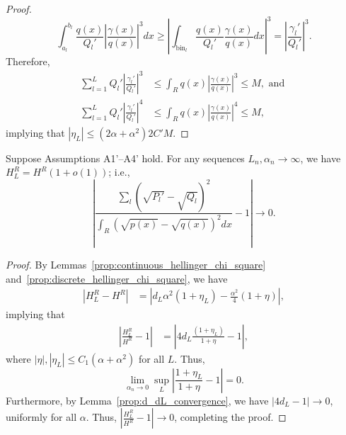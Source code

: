 \documentclass{article}
\newcommand{\bin}{\text{bin}}
\begin{document}
\begin{proof}
\[
\int_{a_l}^{b_l} \frac{q(x)}{Q_l'} \left| \frac{\gamma(x)}{q(x)} \right|^3 dx \geq
 \left| \int_{\bin_l} \frac{q(x)}{Q_l'} \frac{\gamma(x)}{q(x)} dx \right|^3 =
 \left| \frac{\gamma_l'}{Q_l'} \right|^3.
\]
Therefore,
\begin{align*}
\sum_{l=1}^L Q_l' \left| \frac{\gamma_l'}{Q_l'} \right|^3 &\leq \int_R q(x) \left| \frac{\gamma(x)}{q(x)} \right|^3 \leq M,  \text{ and }\\
\sum_{l=1}^L Q_l' \left| \frac{\gamma_l'}{Q_l'} \right|^4 &\leq \int_R q(x) \left| \frac{\gamma(x)}{q(x)} \right|^4 \leq M,
\end{align*}
implying that $|\eta_L| \leq (2 \alpha + \alpha^2) 2 C' M$.
\end{proof}






\begin{lemma}
\label{prop:H_HL_convergence_R}
Suppose Assumptions A1'--A4' hold. For any sequences $L_n, \alpha_n \rightarrow \infty$, we have $H^R_L = H^R(1+o(1))$; i.e.,
\[
\left| \frac{\sum_l (\sqrt{P_l'} - \sqrt{Q_l})^2}{\int_R (\sqrt{p(x)} - \sqrt{q(x)})^2 dx} 
        - 1 \right| \rightarrow 0.
\]

\end{lemma}

\begin{proof}
By Lemmas~\ref{prop:continuous_hellinger_chi_square} and~\ref{prop:discrete_hellinger_chi_square}, we have
\begin{align*}
| H^R_L - H^R | & = \left| d_L \alpha^2 ( 1 + \eta_L) -  \frac{\alpha^2}{4} ( 1 + \eta) \right|,
 \end{align*}
implying that
\begin{align*}
\left| \frac{H^R_L}{H^R} - 1 \right| &= \left |4d_L \frac{(1+\eta_L)}{1 + \eta} - 1 \right|,
\end{align*}
where $|\eta|, |\eta_L| \leq C_1(\alpha + \alpha^2)$ for all $L$. Thus,
\[
\lim_{\alpha_n \rightarrow 0} \sup_L \left| \frac{1+\eta_L}{1+\eta} - 1 \right| = 0.
\]
Furthermore, by Lemma~\ref{prop:d_dL_convergence}, we have $|4d_L - 1| \rightarrow 0$,
uniformly for all $\alpha$. Thus, $\left| \frac{H^R_L}{H^R} - 1 \right| \to 0$, completing the proof.
\end{proof}

\end{document}
